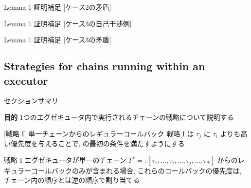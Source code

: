 {    \begin{frame}{Lemma 1 証明補足 [ケース2の矛盾]}
    \end{frame}

    \begin{frame}{Lemma 1 証明補足 [ケース3の自己干渉例]}
    \end{frame}

    \begin{frame}{Lemma 1 証明補足 [ケース3の矛盾]}
    \end{frame}
}


\subsection{Strategies for chains running within an executor}
\label{ssec: strategies for chains running within an executor}

\begin{frame}{セクションサマリ}
    \begin{itembox}[l]{\textbf{目的}}
        1つのエグゼキュータ内で実行されるチェーンの戦略について説明する
    \end{itembox}
\end{frame}

\begin{frame}{}
\end{frame}

\begin{frame}[label=strategy1]{[戦略 I] 単一チェーンからのレギュラーコールバック}
    戦略 I は $\tau_{j}$ に $\tau_{i}$ よりも高い優先度を与えることで,  の最初の条件を満たすようにする
    \begin{block}{戦略 I}
        エグゼキュータが単一のチェーン $\Gamma^{c}=:\left[\tau_{1}, \ldots, \tau_{i}, \ldots, \tau_{j}, \ldots, \tau_{N}\right]$ からのレギュラーコールバックのみが含まれる場合, これらのコールバックの優先度は, チェーン内の順序とは逆の順序で割り当てる
    \end{block}
\end{frame}


